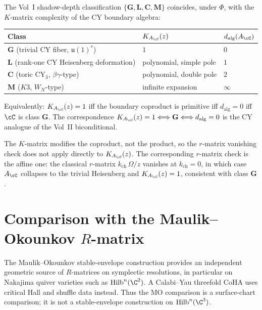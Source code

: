 \begin{remark}
The Vol~I shadow-depth classification $\{\mathbf{G}, \mathbf{L}, \mathbf{C}, \mathbf{M}\}$ coincides, under $\Phi$, with the $K$-matrix complexity of the CY boundary algebra:
\begin{center}
\renewcommand{\arraystretch}{1.2}
\begin{tabular}{lll}
\toprule
Class & $K_{A_\cC}(z)$ & $d_{\mathrm{alg}}(A_\cC)$ \\
\midrule
$\mathbf{G}$ (trivial CY fiber, $\mathfrak{u}(1)^r$) & $1$ & $0$ \\
$\mathbf{L}$ (rank-one CY Heisenberg deformation) & polynomial, simple pole & $1$ \\
$\mathbf{C}$ (toric CY$_3$, $\beta\gamma$-type) & polynomial, double pole & $2$ \\
$\mathbf{M}$ ($K3$, $W_N$-type) & infinite expansion & $\infty$ \\
\bottomrule
\end{tabular}
\end{center}
Equivalently: $K_{A_\cC}(z) = 1$ iff the boundary coproduct is primitive iff $d_{\mathrm{alg}} = 0$ iff $\cC$ is class $\mathbf{G}$. The correspondence $K_{A_\cC}(z) = 1 \Longleftrightarrow \mathbf{G} \Longleftrightarrow d_{\mathrm{alg}} = 0$ is the CY analogue of the Vol~II biconditional.

The $K$-matrix modifies the coproduct, not the product, so the $r$-matrix vanishing check does not apply directly to $K_{A_\cC}(z)$. The corresponding $r$-matrix check is the affine one: the classical $r$-matrix $k_{\mathrm{ch}}\,\Omega/z$ vanishes at $k_{\mathrm{ch}} = 0$, in which case $A_\cC$ collapses to the trivial Heisenberg and $K_{A_\cC}(z) = 1$, consistent with class $\mathbf{G}$.
\end{remark}


\section{Comparison with the Maulik--Okounkov \texorpdfstring{$R$}{R}-matrix}
\label{sec:mo-rmatrix-comparison}

The Maulik--Okounkov stable-envelope construction provides an
independent geometric source of \(R\)-matrices on symplectic
resolutions, in particular on Nakajima quiver varieties such as
\(\mathrm{Hilb}^n(\C^2)\).  A Calabi--Yau threefold CoHA uses
critical Hall and shuffle data instead.  Thus the MO comparison is a
surface-chart comparison; it is not a stable-envelope construction on
\(\mathrm{Hilb}^n(\C^3)\).

